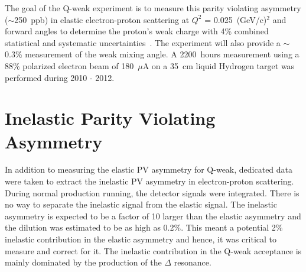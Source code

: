The goal of the Q-weak experiment is to measure this parity violating asymmetry ($\sim$250~ppb) in elastic electron-proton scattering at $Q^{2}$ = 0.025~(GeV/c)$^{2}$ and forward angles to determine the proton's weak charge with 4\% combined statistical and systematic uncertainties~\cite{qweak_proposal_2007}.
The experiment will also provide a $\sim$0.3\% measurement of the weak mixing angle. 
A 2200~hours measurement using a 88\% polarized electron beam of 180~$\mu$A on a 35~cm liquid Hydrogen target was performed during 2010 - 2012.


\section{Inelastic Parity Violating Asymmetry}
\label{Inelastic Parity Violating Asymmetry}

In addition to measuring the elastic PV asymmetry for Q-weak, dedicated data were taken to extract the inelastic PV asymmetry in electron-proton scattering. During normal production running, the detector signals were integrated. There is no way to separate the inelastic signal from the elastic signal. The inelastic asymmetry is expected to be a factor of 10 larger than the elastic asymmetry and the dilution was estimated to be as high as 0.2\%. This meant a potential 2\% inelastic contribution in the elastic asymmetry and hence, it was critical to measure and correct for it. The inelastic contribution in the Q-weak acceptance is mainly dominated by the production of the $\Delta$ resonance.


